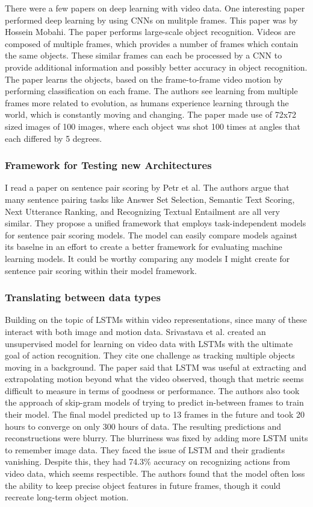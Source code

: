 There were a few papers on deep learning with video data.  One interesting paper performed deep learning by using CNNs on mulitple frames.  This paper was by Hossein Mobahi.  The paper performs large-scale object recognition.  Videos are composed of multiple frames, which provides a number of frames which contain the same objects.  These similar frames can each be processed by a CNN to provide additional information and possibly better accuracy in object recognition.  The paper learns the objects, based on the frame-to-frame video motion by performing classification on each frame.  The authors see learning from multiple frames more related to evolution, as humans experience learning through the world, which is constantly moving and changing.  The paper made use of 72x72 sized images of 100 images, where each object was shot 100 times at angles that each differed by 5 degrees.




\subsubsection{Framework for Testing new Architectures}
I read a paper on sentence pair scoring by Petr et al.  The authors argue that many sentence pairing tasks like Answer Set Selection, Semantic Text Scoring, Next Utterance Ranking, and Recognizing Textual Entailment are all very similar.  They propose a unified framework that employs task-independent models for sentence pair scoring models.  The model can easily compare models against its baselne in an effort to create a better framework for evaluating machine learning models.  It could be worthy comparing any models I might create for sentence pair scoring within their model framework.

\subsubsection{Translating between data types}

Building on the topic of LSTMs within video representations, since many of these interact with both image and motion data.  Srivastava et al. created an unsupervised model for learning on video data with LSTMs with the ultimate goal of action recognition.  They cite one challenge as tracking multiple objects moving in a background.  The paper said that LSTM was useful at extracting and extrapolating motion beyond what the video observed, though that metric seems difficult to measure in terms of goodness or performance. The authors also took the approach of skip-gram models of trying to predict in-between frames to train their model. The final model predicted up to 13 frames in the future and took 20 hours to converge on only 300 hours of data. The resulting predictions and reconstructions were blurry.  The blurriness was fixed by adding more LSTM units to remember image data.  They faced the issue of LSTM and their gradients vanishing.  Despite this, they had 74.3\% accuracy on recognizing actions from video data, which seems respectible.  The authors found that the model often loss the ability to keep precise object features in future frames, though it could recreate long-term object motion. 

